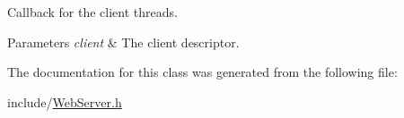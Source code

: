 Callback for the client threads. 


\begin{DoxyParams}{Parameters}
{\em client} & The client descriptor. \\
\hline
\end{DoxyParams}


The documentation for this class was generated from the following file\+:\begin{DoxyCompactItemize}
\item 
include/\hyperlink{_web_server_8h}{Web\+Server.\+h}\end{DoxyCompactItemize}

